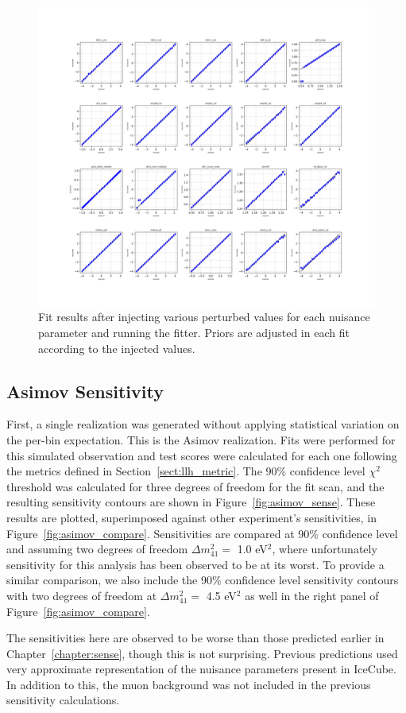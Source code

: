 \documentclass[main.tex]{subfiles}
\begin{document}
\begin{figure}
    \centering 
    \includegraphics[width=0.7\linewidth]{figures/inject_recover_syst_prior.png}
    \caption{Fit results after injecting various perturbed values for each nuisance parameter and running the fitter. Priors are adjusted in each fit according to the injected values.}\label{fig:ir_priorpert}
\end{figure}

\subsection{Asimov Sensitivity}

First, a single realization was generated without applying statistical variation on the per-bin expectation. 
This is the Asimov realization. 
Fits were performed for this simulated observation and test scores were calculated for each one following the metrics defined in Section~\ref{sect:llh_metric}.
The 90\% confidence level $\chi^{2}$ threshold was calculated for three degrees of freedom for the fit scan, and the resulting sensitivity contours are shown in Figure~\ref{fig:asimov_sense}. 
These results are plotted, superimposed against other experiment's sensitivities, in Figure~\ref{fig:asimov_compare}. 
Sensitivities are compared at 90\% confidence level and assuming two degrees of freedom $\Delta m_{41}^{2}=$ 1.0 eV$^{2}$, where unfortunately sensitivity for this analysis has been observed to be at its worst. 
To provide a similar comparison, we also include the 90\% confidence level sensitivity contours with two degrees of freedom at $\Delta m_{41}^{2}=$ 4.5 eV$^{2}$ as well in the right panel of Figure~\ref{fig:asimov_compare}.

The sensitivities here are observed to be worse than those predicted earlier in Chapter~\ref{chapter:sense}, though this is not surprising. 
Previous predictions used very approximate representation of the nuisance parameters present in IceCube. 
In addition to this, the muon background was not included in the previous sensitivity calculations.
\end{document}
